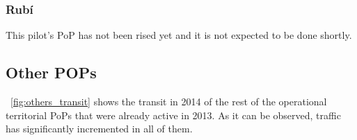 \FloatBarrier
\subsubsection{Rub\'{i}}
\label{pop_rubi}

This pilot's PoP has not been rised yet and it is not expected to be done shortly.


\FloatBarrier
\subsection{Other POPs}
\label{pop_others}

\figurename~\ref{fig:others_transit} shows the transit in 2014 of the rest of the operational territorial PoPs that were already active in 2013. As it can be observed, traffic has significantly incremented in all of them.

